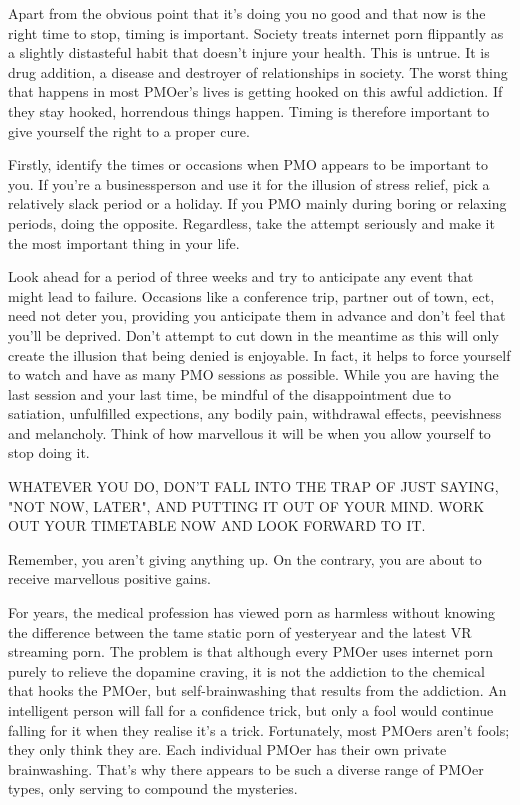 \documentclass[easypeasy.tex]{subfiles}
\begin{document}
Apart from the obvious point that it's doing you no good and that now is the right time to stop, timing is important. Society treats internet porn flippantly as a slightly distasteful habit that doesn't injure your health. This is untrue. It is drug addition, a disease and destroyer of relationships in society. The worst thing that happens in most PMOer's lives is getting hooked on this awful addiction. If they stay hooked, horrendous things happen. Timing is therefore important to give yourself the right to a proper cure.

Firstly, identify the times or occasions when PMO appears to be important to you. If you're a businessperson and use it for the illusion of stress relief, pick a relatively slack period or a holiday. If you PMO mainly during boring or relaxing periods, doing the opposite. Regardless, take the attempt seriously and make it the most important thing in your life.

Look ahead for a period of three weeks and try to anticipate any event that might lead to failure. Occasions like a conference trip, partner out of town, ect, need not deter you, providing you anticipate them in advance and don't feel that you'll be deprived. Don't attempt to cut down in the meantime as this will only create the illusion that being denied is enjoyable. In fact, it helps to force yourself to watch and have as many PMO sessions as possible. While you are having the last session and your last time, be mindful of the disappointment due to satiation, unfulfilled expections, any bodily pain, withdrawal effects, peevishness and melancholy. Think of how marvellous it will be when you allow yourself to stop doing it.

{\huge WHATEVER YOU DO, DON'T FALL INTO THE TRAP OF JUST SAYING, "NOT NOW, LATER", AND PUTTING IT OUT OF YOUR MIND. WORK OUT YOUR TIMETABLE NOW AND LOOK FORWARD TO IT.}

Remember, you aren't giving anything up. On the contrary, you are about to receive marvellous positive gains.

For years, the medical profession has viewed porn as harmless without knowing the difference between the tame static porn of yesteryear and the latest VR streaming porn. The problem is that although every PMOer uses internet porn purely to relieve the dopamine craving, it is not the addiction to the chemical that hooks the PMOer, but self-brainwashing that results from the addiction. An intelligent person will fall for a confidence trick, but only a fool would continue falling for it when they realise it's a trick. Fortunately, most PMOers aren't fools; they only think they are. Each individual PMOer has their own private brainwashing. That's why there appears to be such a diverse range of PMOer types, only serving to compound the mysteries.
\end{document}
